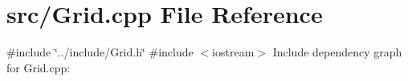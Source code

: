 \section{src/\-Grid.cpp \-File \-Reference}
\label{_grid_8cpp}
{\ttfamily \#include \char`\"{}../include/\-Grid.\-h\char`\"{}}\*
{\ttfamily \#include $<$iostream$>$}\*
\-Include dependency graph for \-Grid.\-cpp\-:
